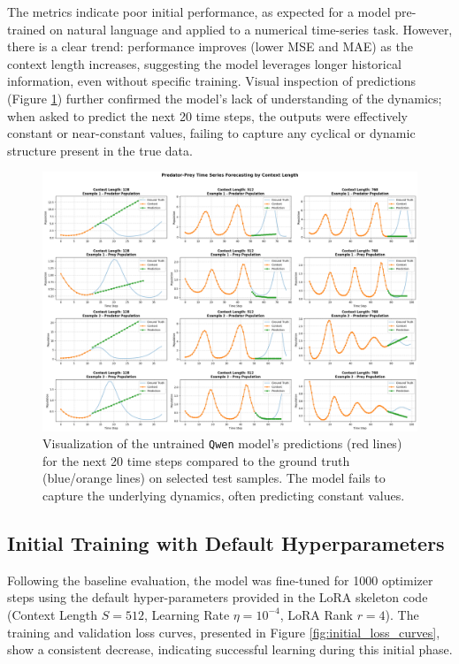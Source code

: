 \documentclass{article}
\begin{document}
The metrics indicate poor initial performance, as expected for a model pre-trained on natural language and applied to a numerical time-series task. However, there is a clear trend: performance improves (lower MSE and MAE) as the context length increases, suggesting the model leverages longer historical information, even without specific training. Visual inspection of predictions (Figure \ref{fig:untrained_predictions}) further confirmed the model's lack of understanding of the dynamics; when asked to predict the next 20 time steps, the outputs were effectively constant or near-constant values, failing to capture any cyclical or dynamic structure present in the true data.

\begin{figure}[!htbp] %
    \centering
    \includegraphics[width=0.9\linewidth]{M2 Course Work//Images/untrained_performance.png} %
    \caption{Visualization of the untrained \texttt{Qwen} model's predictions (red lines) for the next 20 time steps compared to the ground truth (blue/orange lines) on selected test samples. The model fails to capture the underlying dynamics, often predicting constant values.}
    \label{fig:untrained_predictions} %
\end{figure}

\subsection{Initial Training with Default Hyperparameters}

Following the baseline evaluation, the model was fine-tuned for 1000 optimizer steps using the default hyper-parameters provided in the LoRA skeleton code (Context Length $S=512$, Learning Rate $\eta=10^{-4}$, LoRA Rank $r=4$). The training and validation loss curves, presented in Figure \ref{fig:initial_loss_curves}, show a consistent decrease, indicating successful learning during this initial phase.
\end{document}
